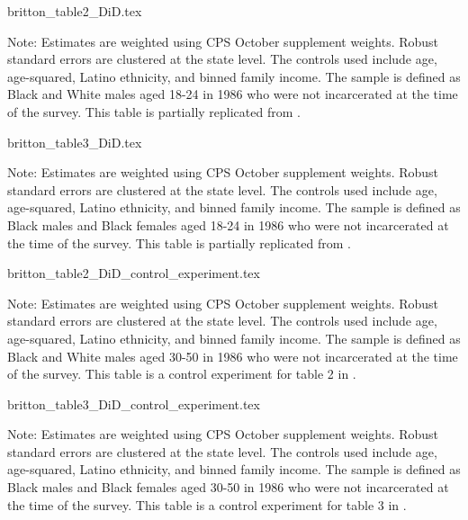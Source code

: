 {britton_table2_DiD.tex}
\begin{footnotesize}
  \noindent Note: Estimates are weighted using CPS October supplement weights. Robust standard errors are clustered at the state level. The controls used include age, age-squared, Latino ethnicity, and binned family income. The sample is defined as Black and White males aged 18-24 in 1986 who were not incarcerated at the time of the survey.
  This table is partially replicated from \cite{britton2022}.
\end{footnotesize}

{britton_table3_DiD.tex}
\begin{footnotesize}
  \noindent Note: Estimates are weighted using CPS October supplement weights. Robust standard errors are clustered at the state level. The controls used include age, age-squared, Latino ethnicity, and binned family income. The sample is defined as Black males and Black females aged 18-24 in 1986 who were not incarcerated at the time of the survey. This table is partially replicated from \cite{britton2022}.
\end{footnotesize}

\clearpage

{britton_table2_DiD_control_experiment.tex}
\begin{footnotesize}
  \noindent Note: Estimates are weighted using CPS October supplement weights. Robust standard errors are clustered at the state level. The controls used include age, age-squared, Latino ethnicity, and binned family income. The sample is defined as Black and White males aged 30-50 in 1986 who were not incarcerated at the time of the survey.
  This table is a control experiment for table 2 in \cite{britton2022}.
\end{footnotesize}

{britton_table3_DiD_control_experiment.tex}
\begin{footnotesize}
  \noindent Note: Estimates are weighted using CPS October supplement weights. Robust standard errors are clustered at the state level. The controls used include age, age-squared, Latino ethnicity, and binned family income. The sample is defined as Black males and Black females aged 30-50 in 1986 who were not incarcerated at the time of the survey.
  This table is a control experiment for table 3 in \cite{britton2022}.
\end{footnotesize}
\clearpage

